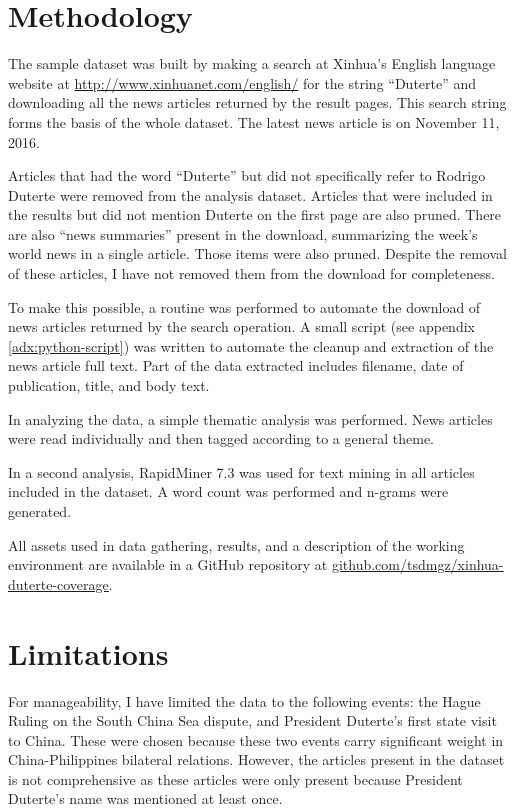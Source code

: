 \section{Methodology}\label{sec:methodology}

The sample dataset was built by making a search at Xinhua's English
language website at \url{http://www.xinhuanet.com/english/} for the
string ``Duterte'' and downloading all the news articles returned by the
result pages. This search string forms the basis of the whole dataset.
The latest news article is on November 11, 2016.

Articles that had the word ``Duterte'' but did not specifically refer to
Rodrigo Duterte were removed from the analysis dataset. Articles that
were included in the results but did not mention Duterte on the first
page are also pruned. There are also ``news summaries'' present in the
download, summarizing the week's world news in a single article. Those
items were also pruned. Despite the removal of these articles, I have
not removed them from the download for completeness.

To make this possible, a routine was performed to automate the
download of news articles returned by the search operation. A small
script (see appendix \ref{adx:python-script}) was written to automate
the cleanup and extraction of the news article full text. Part of the
data extracted includes filename, date of publication, title, and
body text.

In analyzing the data, a simple thematic analysis was performed. News
articles were read individually and then tagged according to a general
theme.

In a second analysis, RapidMiner 7.3 was used for text mining in all
articles included in the dataset. A word count was performed and
n-grams were generated.

All assets used in data gathering, results, and a description of the
working environment are available in a GitHub repository at
\href{https://github.com/tsdmgz/xinhua-duterte-coverage}{github.com/tsdmgz/xinhua-duterte-coverage}.

\section{Limitations}\label{sec:limits}

For manageability, I have limited the data to the following events: the
Hague Ruling on the South China Sea dispute, and President Duterte's
first state visit to China. These were chosen because these two events
carry significant weight in China-Philippines bilateral relations.
However, the articles present in the dataset is not comprehensive as
these articles were only present because President Duterte's name was
mentioned at least once.

